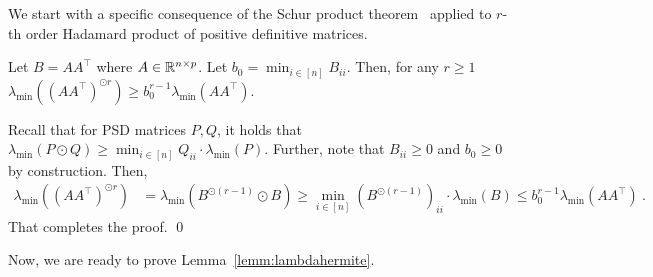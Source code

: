 We start with a specific consequence of the Schur product theorem~\cite[Lemma 6.5]{oymak2020hermite} applied to $r$-th order Hadamard product of positive definitive matrices.
\begin{prop}
Let $B = AA^\top$ where $A \in \mathbb{R}^{n \times p}$. Let $b_0 = \min_{i \in [n]} B_{ii}$. Then, for any $r \geq 1$ $\lambda_{\min}( (A A^\top)^{\odot r}) \geq b_0^{r-1} \lambda_{\min}(AA^\top)$.
\label{lemm:schurhad}
\end{prop}
\proof Recall that for PSD matrices $P, Q$, it holds that $\lambda_{\min}(P \odot Q) \geq \min_{i \in [n]} Q_{ii} \cdot \lambda_{\min}(P)$. Further, note that $B_{ii} \geq 0$ and $b_0 \geq 0$ by construction. Then,
\begin{align*}
\lambda_{\min}( (A A^\top)^{\odot r}) & = \lambda_{\min}(B^{\odot (r-1)} \odot B) \geq \min_{i \in [n]} (B^{\odot (r-1)})_{ii} \cdot \lambda_{\min}(B)  \leq  b_0^{r-1} \lambda_{\min}(AA^\top)~.
\end{align*}
That completes the proof. \qed 


Now, we are ready to prove Lemma~\ref{lemm:lambdahermite}.
%

